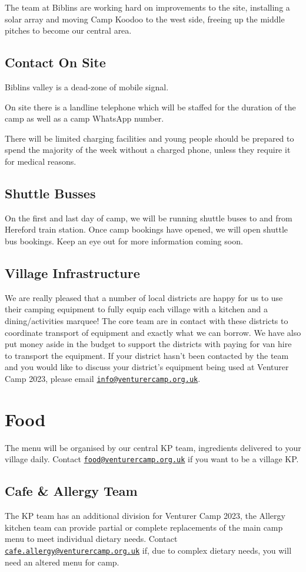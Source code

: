 \documentclass[a4paper, 10pt]{report}
\begin{document}
The team at Biblins are working hard on improvements to the site, installing a solar array and moving Camp Koodoo to the west side, freeing up the middle pitches to become our central area. 
\section{Contact On Site}
Biblins valley is a dead-zone of mobile signal.

On site there is a landline telephone which will be staffed for the duration of the camp as well as a camp WhatsApp number.

There will be limited charging facilities and young people should be prepared to spend the majority of the week without a charged phone, unless they require it for medical reasons.
\section{Shuttle Busses}
On the first and last day of camp, we will be running shuttle buses to and from Hereford train station. Once camp bookings have opened, we will open shuttle bus bookings. Keep an eye out for more information coming soon.
\section{Village Infrastructure}
We are really pleased that a number of local districts are happy for us to use their camping equipment to fully equip each village with a kitchen and a dining/activities marquee! The core team are in contact with these districts to coordinate transport of equipment and exactly what we can borrow. We have also put money aside in the budget to support the districts with paying for van hire to transport the equipment. If your district hasn't been contacted by the team and you would like to discuss your district's equipment being used at Venturer Camp 2023, please email \href{mailto:info@venturercamp.org.uk}{\texttt{info@venturercamp.org.uk}}.

\chapter{Food}
The menu will be organised by our central KP team, ingredients delivered to your village daily. Contact \href{mailto:food@venturercamp.org.uk}{\texttt{food@venturercamp.org.uk}} if you want to be a village KP.
\section{Cafe \& Allergy Team}
The KP team has an additional division for Venturer Camp 2023, the Allergy kitchen team can provide partial or complete replacements of the main camp menu to meet individual dietary needs. Contact \href{mailto:cafe.allergy@venturercamp.org.uk}{\texttt{cafe.allergy@venturercamp.org.uk}} if, due to complex dietary needs, you will need an altered menu for camp. 
\end{document}
